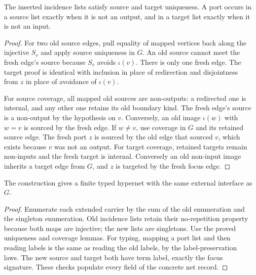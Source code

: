 \begin{lemma}
The inserted incidence lists satisfy source and target uniqueness. A port
occurs in a source list exactly when it is not an output, and in a target list
exactly when it is not an input.
\end{lemma}
\begin{proof}
For two old source edges, pull equality of mapped vertices back along the
injective $S_v$ and apply source uniqueness in $G$. An old source cannot meet
the fresh edge's source because $S_v$ avoids $\iota(v)$. There is only one
fresh edge. The target proof is identical with inclusion in place of
redirection and disjointness from $z$ in place of avoidance of $\iota(v)$.

For source coverage, all mapped old sources are non-outputs: a redirected one
is internal, and any other one retains its old boundary kind. The fresh edge's
source is a non-output by the hypothesis on $v$. Conversely, an old image
$\iota(w)$ with $w=v$ is sourced by the fresh edge. If $w\ne v$, use coverage
in $G$ and its retained source edge. The fresh port $z$ is sourced by the old
edge that sourced $v$, which exists because $v$ was not an output.
For target coverage, retained targets remain non-inputs and the fresh target
is internal. Conversely an old non-input image inherits a target edge from
$G$, and $z$ is targeted by the fresh focus edge.
\end{proof}

\begin{theorem}
The construction gives a finite typed hypernet with the same external
interface as $G$.
\end{theorem}
\begin{proof}
Enumerate each extended carrier by the sum of the old enumeration and the
singleton enumeration. Old incidence lists retain their no-repetition property
because both maps are injective; the new lists are singletons. Use the proved
uniqueness and coverage lemmas. For typing, mapping a port list and then reading
labels is the same as reading the old labels, by the label-preservation laws.
The new source and target both have term label, exactly the focus signature.
These checks populate every field of the concrete net record.
\end{proof}

